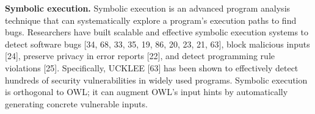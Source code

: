 \noindent
\textbf{Symbolic execution.} Symbolic execution is an advanced program
analysis technique that can systematically explore a program’s
execution paths to find bugs. Researchers have built
scalable and effective symbolic execution systems to detect
software bugs [34, 68, 33, 35, 19, 86, 20, 23, 21, 63], block
malicious inputs [24], preserve privacy in error reports [22],
and detect programming rule violations [25]. Specifically,
UCKLEE [63] has been shown to effectively detect hundreds
of security vulnerabilities in widely used programs. Symbolic
execution is orthogonal to OWL; it can augment OWL’s input
hints by automatically generating concrete vulnerable inputs.